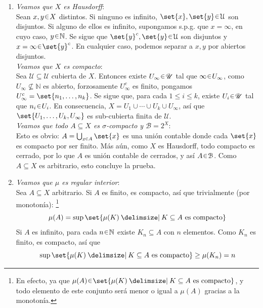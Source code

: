 \begin{sol}
\begin{enumerate}[label = (\roman*), leftmargin=1.5em]
\item %
\emph{Veamos que $X$ es Hausdorff}:\\
Sean $x,y\en X$ distintos. Si ninguno es infinito, $\set{x},\set{y}\en\mathcal{U}$ son disjuntos. Si alguno de ellos es infinito, supongamos s.p.g. que $x=\infty$, en cuyo caso, $y\en\mathbb{N}$. Se sigue que $\set{y}^c,\set{y} \en \mathcal{U}$ son disjuntos y $x=\infty \en \set{y}^c$. En cualquier caso, podemos separar a $x,y$ por abiertos disjuntos.\vspace{1em}\\
\emph{Veamos que $X$ es compacto}:\\
Sea $\mathscr{U} \subseteq {\mathcal{U}}$ cubierta de $X$. Entonces existe $U_\infty \en \mathscr{U}$ tal que $\infty \en U_{\infty}$, como $U_\infty \nsubseteq \mathbb{N}$ es abierto, forzosamente $U^c_\infty$ es finito, pongamos $U^c_\infty = \set{n_1,\dots,n_k}$. Se sigue que, para cada $1 \le i \le k$, existe $U_i\en\mathscr{U}$ tal que $n_i \en U_i$. En consecuencia, $X = U_1 \cup \cdots\cup U_k \cup U_\infty$, así que $\set{U_1,\dots,U_k,U_\infty}$ es sub-cubierta finita de $\mathscr{U}$.\vspace{1em}\\
\emph{Veamos que todo $A\subseteq X$ es $\sigma$-compacto y $\mathcal{B} = 2^X$}:\\
Esto es obvio: $A = \bigcup_{x\en A}\set{x}$ es una unión contable donde cada $\set{x}$ es compacto por ser finito. Más aún, como $X$ es Hausdorff, todo compacto es cerrado, por lo que $A$ es unión contable de cerrados, y así $A \en \mathcal{B}$. Como $A\subseteq X$ es arbitrario, esto concluye la prueba.
\item %
\emph{Veamos que $\mu$ es regular interior}:\\
Sea $A\subseteq X$ arbitrario. Si $A$ es finito, es compacto, así que trivialmente (por monotonía):%
\footnote{
En efecto, ya que $\mu(A) \en \set{\mu(K) \given K \subseteq A \text{ es compacto}}$, y todo elemento de este conjunto será menor o igual a $\mu(A)$ gracias a la monotonía.
}
\[
\mu(A) = \sup\set{\mu(K) \given K \subseteq A \text{ es compacto}}
\]
Si $A$ es infinito, para cada $n\en\mathbb{N}$ existe $K_n \subseteq A$ con $n$ elementos. Como $K_n$ es finito, es compacto, así que
\[
\sup\set{\mu(K) \given K \subseteq A \text{ es compacto}} \ge \mu(K_n) =n
\]
\end{enumerate}
\end{sol}

